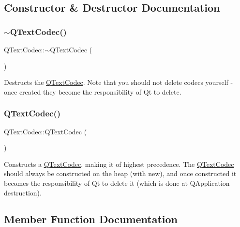 \subsection{Constructor \& Destructor Documentation}
\mbox{\label{class_q_text_codec_af84836a011269c9eb67241cf8c638d83}} 
\subsubsection{\texorpdfstring{$\sim$QTextCodec()}{~QTextCodec()}}
{\footnotesize\ttfamily Q\+Text\+Codec\+::$\sim$\+Q\+Text\+Codec (\begin{DoxyParamCaption}{ }\end{DoxyParamCaption})\hspace{0.3cm}{\ttfamily [virtual]}}

Destructs the \mbox{\hyperlink{class_q_text_codec}{Q\+Text\+Codec}}. Note that you should not delete codecs yourself -\/ once created they become the responsibility of Qt to delete. \mbox{\label{class_q_text_codec_a237562a5481646e6f1c7656a1156719f}} 
\subsubsection{\texorpdfstring{QTextCodec()}{QTextCodec()}}
{\footnotesize\ttfamily Q\+Text\+Codec\+::\+Q\+Text\+Codec (\begin{DoxyParamCaption}{ }\end{DoxyParamCaption})\hspace{0.3cm}{\ttfamily [protected]}}

Constructs a \mbox{\hyperlink{class_q_text_codec}{Q\+Text\+Codec}}, making it of highest precedence. The \mbox{\hyperlink{class_q_text_codec}{Q\+Text\+Codec}} should always be constructed on the heap (with new), and once constructed it becomes the responsibility of Qt to delete it (which is done at Q\+Application destruction). 

\subsection{Member Function Documentation}
\mbox{\label{class_q_text_codec_a02a5132a63fb0f8a7bd733f256e96d28}} 
